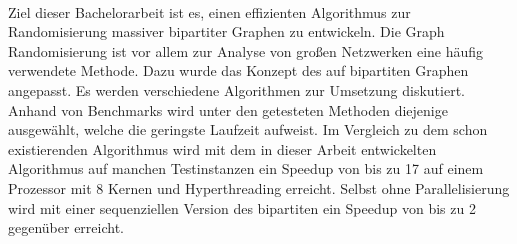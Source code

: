 
~\\

Ziel dieser Bachelorarbeit ist es, einen effizienten Algorithmus
zur Randomisierung massiver bipartiter Graphen zu entwickeln.
Die Graph Randomisierung ist vor allem zur Analyse von großen Netzwerken eine häufig verwendete Methode.
 Dazu 
wurde das Konzept des \gc{} auf bipartiten Graphen
angepasst. Es werden verschiedene Algorithmen zur Umsetzung diskutiert.
Anhand von Benchmarks wird unter den getesteten Methoden diejenige ausgewählt,
welche die geringste Laufzeit aufweist.
Im Vergleich zu dem schon existierenden \cb{} Algorithmus 
wird mit dem in dieser Arbeit entwickelten Algorithmus 
auf manchen Testinstanzen ein Speedup von bis zu 17 auf einem Prozessor mit 8 Kernen und Hyperthreading 
erreicht. Selbst ohne Parallelisierung wird mit einer sequenziellen Version des bipartiten \gc{} ein Speedup
von bis zu 2 gegenüber \cb{} erreicht.

